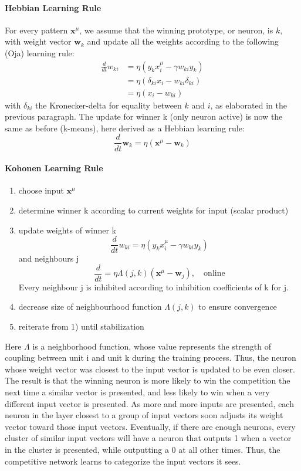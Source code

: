 \documentclass[11pt]{article}
\begin{document}
\paragraph{Hebbian Learning Rule}
For every pattern $\mathbf{x}^\mu$, we assume that the winning prototype, or neuron, is $k$, with weight vector $\mathbf{w}_k$ and update all the weights according to the following (Oja) learning rule:
\begin{align*}
\frac{d}{dt}w_{ki}&=\eta(y_k x_i^\mu-\gamma w_{ki}y_k)\\
&=\eta(\delta_{ki} x_i-w_{ki}\delta_{ki})\\
&=\eta(x_i-w_{ki})
\end{align*}
with $\delta_{ki}$ the Kronecker-delta for equality between $k$ and $i$, as elaborated in the previous paragraph.
The update for winner k (only neuron active) is now the same as before (k-means), here derived as a Hebbian learning rule:
\[
\frac{d}{dt} \mathbf{w}_{k}=\eta(\mathbf{x}^\mu-\mathbf{w}_{k})
\]

\paragraph{Kohonen Learning Rule}
\begin{enumerate}
\item choose input $\mathbf{x}^\mu$
\item determine winner k according to current weights for input (scalar product)
\item update weights of winner k \[
\frac{d}{dt} w_{ki}=\eta(y_kx_i^\mu-\gamma w_{ki}y_k)
\]
and neighbours j
\[
\frac{d}{dt} = \eta \Lambda(j,k)(\mathbf{x}^\mu-\mathbf{w}_j),\quad \text{online}
\] Every neighbour j is inhibited according to inhibition coefficients of k for j.
\item decrease size of neighbourhood function $\Lambda(j,k)$ to ensure convergence
\item reiterate from 1) until stabilization
\end{enumerate}
Here $\Lambda$ is a neighborhood function, whose value represents the strength of coupling between unit i and unit k during the training process.
Thus, the neuron whose weight vector was closest to the input vector is updated to be even closer. The result is that the winning neuron is more likely to win the competition the next time a similar vector is presented, and less likely to win when a very different input vector is presented. As more and more inputs are presented, each neuron in the layer closest to a group of input vectors soon adjusts its weight vector toward those input vectors. Eventually, if there are enough neurons, every cluster of similar input vectors will have a neuron that outputs 1 when a vector in the cluster is presented, while outputting a 0 at all other times. Thus, the competitive network learns to categorize the input vectors it sees.
\end{document}
